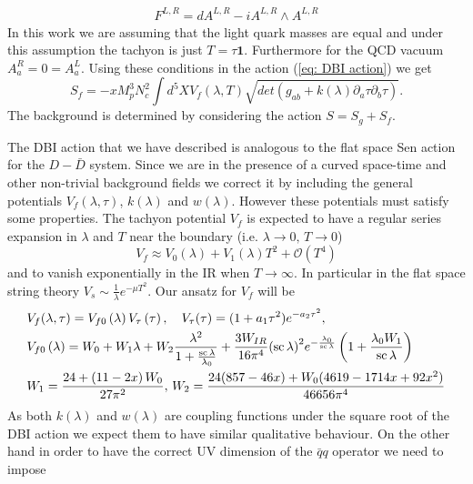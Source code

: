 \documentclass[a4paper,12pt]{article}
\begin{document}
\begin{align}
F^{L,R} = d A^{L,R} - i A^{L,R} \wedge A^{L,R}
\end{align}
In this work we are assuming that the light quark masses are equal and under this assumption the tachyon is just $T = \tau \mathbf{1}$. Furthermore for the QCD vacuum $A^R_a = 0 = A^L_a$. Using these conditions in the action (\ref{eq: DBI action}) we get
\begin{equation}
S_f = - x M_p^3 N_c^2 \int d^5 X V_f\left(\lambda, T\right) \sqrt{det\left(g_{ab} + k\left(\lambda\right) \partial_a \tau \partial_b \tau \right)}.
\label{eq:sf_equation}
\end{equation}
The background is determined by considering the action $S = S_g + S_f$.

The DBI action that we have described is analogous to the flat space Sen action for the $D - \bar{D}$ system. Since we are in the presence of a curved space-time  and other non-trivial background fields we correct it by including the general potentials $V_f(\lambda, \tau)$, $k(\lambda)$ and $w(\lambda)$. However these potentials must satisfy some properties. The tachyon potential $V_f$ is expected to have a regular series expansion in $\lambda$ and $T$ near the boundary (i.e. $\lambda \rightarrow 0, \, T \rightarrow 0$)
\begin{equation}
V_f \approx V_0 (\lambda) + V_1 (\lambda) T^2 + \mathcal{O}(T^4)
\end{equation} 
and to vanish exponentially in the IR when $T \rightarrow \infty$. In particular in the flat space string theory $V_s \sim \frac{1}{\lambda} e^{- \mu T^2}$. Our ansatz for $V_f$ will be
\begin{align}
& V_f(\lambda, \tau) = V_{f0} \left(\lambda\right) V_\tau \left(\tau\right), \quad V_\tau (\tau) = ( 1 + a_1 \tau^2) e^{- a_2 \tau^2}, \\ \notag
& V_{f0}\left(\lambda\right) = W_0 + W_1 \lambda + W_2 \frac{\lambda^2}{1+ \frac{\rm{sc} \, \lambda}{\lambda_0}} + \frac{3 W_{IR}}{16 \pi^4} {\left(\rm{sc} \, \lambda \right)}^2 e^{- \frac{\lambda_0}{\rm{sc} \, \lambda}} \left( 1 + \frac{\lambda_0 W_1}{\rm{sc} \, \lambda}\right) \\
& W_1 = \frac{24 + \left(11- 2 x\right) W_0}{27 \pi^2}, \, W_2 =  \frac{24 (857 - 46 x) + W_0 (4619 - 1714 x + 92 x^2)}{46656 \pi^4} 
\end{align}
As both $k(\lambda)$ and $w(\lambda)$ are coupling functions under the square root of the DBI action we expect them to have similar qualitative behaviour. On the other hand in order to have the correct UV dimension of the $\bar{q}q$ operator we need to impose
\end{document}
